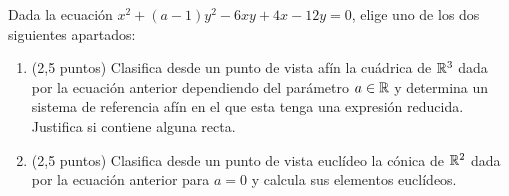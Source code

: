 \documentclass[12pt]{article}
\begin{document}
    \begin{ejercicio}[2,5 puntos]
        Dada la ecuación $x^2+(a-1)y^2-6xy+4x-12y=0$, elige uno de los dos siguientes apartados:
        \begin{enumerate}
            \item (2,5 puntos) Clasifica desde un punto de vista afín la cuádrica de $\mathbb{R}^3$ dada por la ecuación anterior dependiendo del parámetro $a \in \mathbb{R}$ y determina un sistema de referencia afín en el que esta tenga una expresión reducida.
            Justifica si contiene alguna recta.
            \item (2,5 puntos) Clasifica desde un punto de vista euclídeo la cónica de $\mathbb{R}^2$ dada por la ecuación anterior para $a=0$ y calcula sus elementos euclídeos.
        \end{enumerate}
    \end{ejercicio}



     
\end{document}

